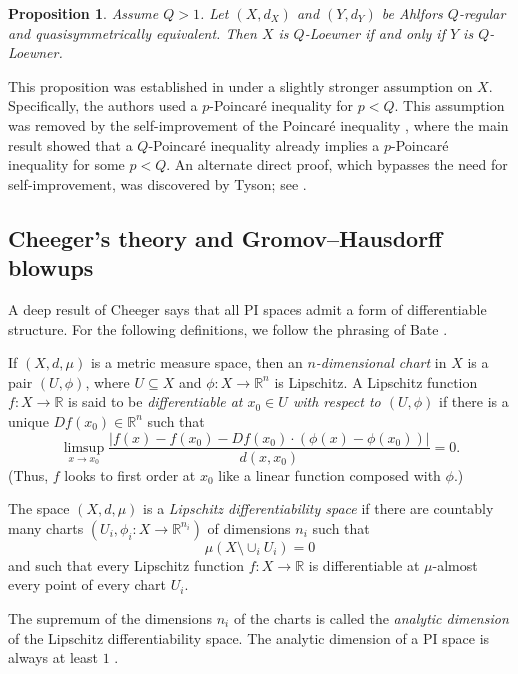 \documentclass{amsart}
\theoremstyle{plain}
\newtheorem{proposition}[theorem]{Proposition}
\theoremstyle{definition}
\numberwithin{equation}{section}
\numberwithin{theorem}{section}
\newcommand{\RR}{\mathbb{R}}
\begin{document}
\begin{proposition}\label{prop:quasiinv} Assume $Q>1$. Let $(X,d_X)$ and $(Y,d_Y)$ be Ahlfors $Q$-regular and quasisymmetrically equivalent. Then $X$ is $Q$-Loewner if and only if $Y$ is $Q$-Loewner.
\end{proposition}

This proposition was established in \cite[Theorem 8.5]{HK} under a slightly stronger assumption on $X$. Specifically, the authors used a $p$-Poincar\'e inequality for $p<Q$. This assumption was removed by the self-improvement of the Poincar\'e inequality \cite{KZ}, where the main result showed that a $Q$-Poincar\'e inequality already implies a $p$-Poincar\'e inequality for some $p<Q$. An alternate direct proof, which bypasses the need for self-improvement, was discovered by Tyson; see \cite[Corollary 1.6]{TQuasi}. 



\subsection{Cheeger's theory and Gromov--Hausdorff blowups}\label{subsec:prelimcheeger}

A deep result of Cheeger \cite{Ch} says that all PI spaces admit a form of differentiable structure. For the following definitions, we follow the phrasing of Bate \cite{Bate}.

If $(X,d,\mu)$ is a metric measure space, then an \emph{$n$-dimensional chart} in $X$ is a pair $(U,\phi)$, where $U\subseteq X$ and $\phi\colon X\rightarrow\mathbb{R}^n$ is Lipschitz. A Lipschitz function $f\colon X \rightarrow\RR$ is said to be \emph{differentiable at $x_0\in U$ with respect to $(U,\phi)$} if there is a unique $Df(x_0)\in\RR^n$ such that
$$ \limsup_{x\rightarrow x_0} \frac{|f(x)-f(x_0)-Df(x_0)\cdot (\phi(x)-\phi(x_0))|}{d(x,x_0)} = 0.$$
(Thus, $f$ looks to first order at $x_0$ like a linear function composed with $\phi$.)

The space $(X,d,\mu)$ is a \emph{Lipschitz differentiability space} if there are countably many charts $(U_i, \phi_i\colon X \rightarrow\RR^{n_i})$ of dimensions $n_i$ such that
$$ \mu\left(X\setminus \cup_i U_i\right) =0$$
and such that every Lipschitz function $f\colon X \rightarrow \RR$ is differentiable at $\mu$-almost every point of every chart $U_i$.

The supremum of the dimensions $n_i$ of the charts is called the \textit{analytic dimension} of the Lipschitz differentiability space. The analytic dimension of a PI space is always at least $1$ \cite[Section 3.3]{KeithLD}.
\end{document}
